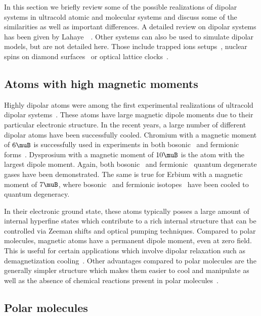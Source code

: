 In this section we briefly review some of the possible realizations of dipolar
systems in ultracold atomic and molecular systems and discuss some of the similarities
as well as important differences. A detailed review on dipolar systems has been given by Lahaye~\etal~\cite{Lahaye2009}. Other systems can also be used to simulate dipolar models, but are not detailed here. Those include trapped ions setups~\cite{Britton2012,Kim2010}, nuclear spins on diamond surfaces~\cite{Cai2012} or optical lattice clocks~\cite{Martin2013}.

\subsection{Atoms with high magnetic moments}

Highly dipolar atoms were among the first experimental realizations of ultracold dipolar
systems~\cite{Griesmaier2005a}. These atoms have large magnetic dipole moments due to their
particular electronic structure. In the recent years, a large number of different dipolar atoms
have been successfully cooled. Chromium with a magnetic moment of $6\muB$ is successfully
used in experiments in both bosonic~\cite{Griesmaier2005a,Beaufils2008} and fermionic
forms~\cite{Naylor2015}. Dysprosium with a magnetic moment of $10\muB$ is the atom with the largest
dipole moment. Again, both bosonic~\cite{Lu2011} and fermionic~\cite{Lu2012} quantum degenerate
gases have been demonstrated. The same is true for Erbium with a magnetic moment of $7\muB$, where
bosonic~\cite{Aikawa2012} and fermionic isotopes~\cite{Aikawa2014} have been cooled to quantum
degeneracy.

In their electronic ground state, these atoms typically posses a large amount of internal hyperfine
states which contribute to a rich internal structure that can be controlled via Zeeman shifts
and optical pumping techniques. Compared to polar molecules, magnetic atoms have a permanent
dipole moment, even at zero field. This is useful for certain applications which involve dipolar
relaxation such as demagnetization cooling~\cite{Hensler2003,Fattori2006,Volchkov2013}. Other
advantages compared to polar molecules are the generally simpler structure which makes them easier
to cool and manipulate as well as the absence of chemical reactions present in polar
molecules~\cite{Ospelkaus2010a,Quemener2012}.

\subsection{Polar molecules}

